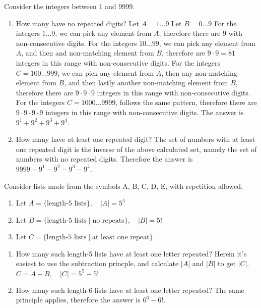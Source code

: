 \documentclass[openany, 11pt]{book}
\begin{document}
\begin{exercise}{}{}
	Consider the integers between 1 and 9999.
	\begin{enumerate}[label = {(\arabic*)}]
		\item How many have no repeated digits?
		      Let $A=1\ldots 9$
		      Let $B=0\ldots 9$
		      For the integers $1\ldots 9$, we can pick any element from $A$, therefore
		      there are $9$ with non-consecutive digits.
		      For the integers $10\ldots 99$, we can pick any element from $A$, and then
		      and non-matching element from $B$, therefore are $9\cdot9=81$ integers in
		      this range with non-consecutive digits.
		      For the integers $C=100\ldots 999$, we can pick any element from $A$, then
		      any non-matching element from $B$, and then lastly another non-matching
		      element from $B$, therefore there are $9\cdot9\cdot9$ integers in this range
		      with non-consecutive digits.
		      For the integers $C=1000\ldots 9999$, follows the same pattern, therefore
		      there are $9\cdot9\cdot9\cdot9$ integers in this range
		      with non-consecutive digits.
		      The answer is $9^1 + 9^2 + 9^3 + 9^4$.

		\item How many have at least one repeated digit?
		      The set of numbers with at least one repeated digit is the inverse of the
		      above calculated set, namely the set of numbers with no repeated digits.
		      Therefore the answer is $9999 - 9^1 - 9^2 - 9^3 - 9^4$.
	\end{enumerate}
\end{exercise}

\begin{exercise}{}{}
	Consider lists made from the symbols A, B, C, D, E, with repetition allowed.
	\begin{enumerate}[label={}, leftmargin=*, itemsep=0pt, parsep=0pt]
		\item Let $A=\{\text{length-5 lists}\},\quad |A| = 5^5$
		\item Let $B=\{\text{length-5 lists}\mid\text{no repeats}\}, \quad |B| = 5!$
		\item Let $C=\{\text{length-5 lists}\mid\text{at least one repeat}\}$
	\end{enumerate}
	\begin{enumerate}[label = {(\alph*)}]
		\item How many such length-5 lists have at least one letter repeated?
		      Herein it's easiest to use the subtraction princple, and calculate $|A|$
		      and $|B|$ to get $|C|$.
		      $C=A - B, \quad |C| = 5^5 - 5! $
		\item How many such length-6 lists have at least one letter repeated?
		      The same principle applies, therefore the answer is $6^6 - 6!$.
	\end{enumerate}
\end{exercise}
\end{document}

